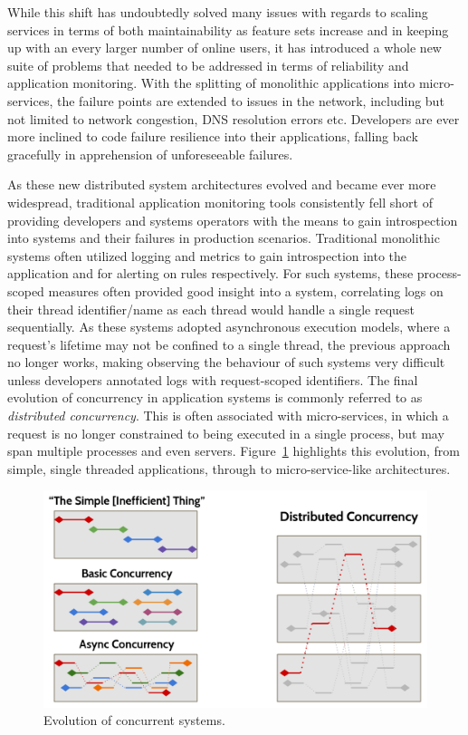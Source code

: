 \documentclass[12pt,pdftex,titlepage]{report}
\begin{document}
            While this shift has undoubtedly solved many issues with regards to scaling services in terms of both maintainability as feature sets increase and in keeping up
            with an every larger number of online users, it has introduced a whole new suite of problems that needed to be addressed in terms of reliability and application 
            monitoring. With the splitting of monolithic applications into micro-services, the failure points are extended to issues in the network, including but not limited
            to network congestion, DNS resolution errors etc. Developers are ever more inclined to code failure resilience into their applications, falling back gracefully in 
            apprehension of unforeseeable failures.

            As these new distributed system architectures evolved and became ever more widespread, traditional application monitoring tools consistently fell short of providing
            developers and systems operators with the means to gain introspection into systems and their failures in production scenarios. Traditional monolithic systems often
            utilized logging and metrics to gain introspection into the application and for alerting on rules respectively. For such systems, these process-scoped measures often 
            provided good insight into a system, correlating logs on their thread identifier/name as each thread would handle a single request sequentially. As these systems 
            adopted asynchronous execution models, where a request's lifetime may not be confined to a single thread, the previous approach no longer works, making observing
            the behaviour of such systems very difficult unless developers annotated logs with request-scoped identifiers. The final evolution of concurrency in application systems is
            commonly referred to as \textit{distributed concurrency}. This is often associated with micro-services, in which a request is no longer constrained to being executed
            in a single process, but may span multiple processes and even servers. Figure~\ref{fig:concurrency} highlights this evolution, from simple, single threaded applications,
            through to micro-service-like architectures.

            \begin{figure}[htb!]
                \centering
                \includegraphics{concurrency.png}
                \caption{Evolution of concurrent systems.}
                \label{fig:concurrency}
            \end{figure}
        
\end{document}

